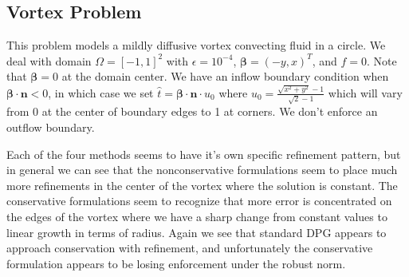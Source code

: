 \documentclass[letterpaper]{article}
\def\bbeta{\boldsymbol\beta}
\begin{document}
\subsection{Vortex Problem}
This problem models a mildly diffusive vortex convecting fluid in a circle. We
deal with domain $\Omega=[-1,1]^2$ with $\epsilon=10^{-4}$, $\bbeta=(-y,x)^T$,
and $f=0$. Note that $\bbeta=0$ at the domain center. We have an inflow
boundary condition when $\bbeta\cdot\mathbf{n}<0$, in which case we set $\hat
t=\bbeta\cdot\mathbf{n}\cdot u_0$ where
$u_0=\frac{\sqrt{x^2+y^2}-1}{\sqrt{2}-1}$ which will vary from 0 at the center
of boundary edges to 1 at corners. We don't enforce an outflow boundary.

Each of the four methods seems to have it's own specific refinement pattern,
but in general we can see that the nonconservative formulations seem to place
much more refinements in the center of the vortex where the solution is
constant. The conservative formulations seem to recognize that more error is
concentrated on the edges of the vortex where we have a sharp change from
constant values to linear growth in terms of radius. Again we see that
standard DPG appears to approach conservation with refinement, and
unfortunately the conservative formulation appears to be losing enforcement
under the robust norm.
\end{document}
